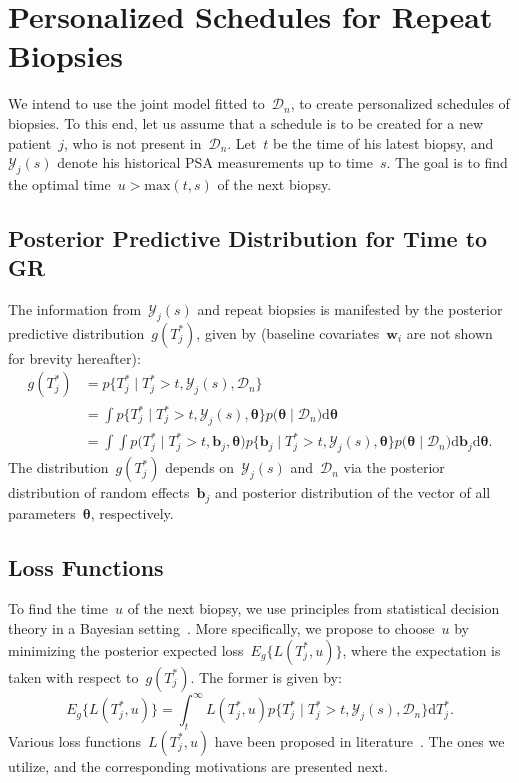 \section{Personalized Schedules for Repeat Biopsies}
\label{c2:sec:pers_sched_approaches}
We intend to use the joint model fitted to~$\mathcal{D}_n$, to create personalized schedules of biopsies. To this end, let us assume that a schedule is to be created for a new patient~$j$, who is not present in~$\mathcal{D}_n$. Let~$t$ be the time of his latest biopsy, and~$\mathcal{Y}_j(s)$ denote his historical PSA measurements up to time~$s$. The goal is to find the optimal time~$u > \mbox{max}(t,s)$ of the next biopsy.

\subsection{Posterior Predictive Distribution for Time to GR}
\label{c2:subsec:ppd_time_to_GR}
The information from~$\mathcal{Y}_j(s)$ and repeat biopsies is manifested by the posterior predictive distribution~$g(T^*_j)$, given by (baseline covariates~$\boldsymbol{w}_i$ are not shown for brevity hereafter):
\begin{equation*}
\label{c2:eq:dyn_dist_fail_time}
\begin{split}
g(T^*_j) &= p\big\{T^*_j \mid T^*_j > t, \mathcal{Y}_j(s), \mathcal{D}_n\big\}\\
&= \int p\big\{T^*_j \mid T^*_j > t, \mathcal{Y}_j(s), \boldsymbol{\theta}\big\}p\big(\boldsymbol{\theta} \mid \mathcal{D}_n\big) \mathrm{d} \boldsymbol{\theta}\\
&= \int \int p\big(T^*_j \mid T^*_j > t, \boldsymbol{b}_j, \boldsymbol{\theta}\big)p\big\{\boldsymbol{b}_j \mid T^*_j>t, \mathcal{Y}_j(s), \boldsymbol{\theta}\big\}p\big(\boldsymbol{\theta} \mid \mathcal{D}_n\big) \mathrm{d} \boldsymbol{b}_j \mathrm{d} \boldsymbol{\theta}.
\end{split}
\end{equation*}
The distribution~$g(T^*_j)$ depends on~$\mathcal{Y}_j(s)$ and~$\mathcal{D}_n$ via the posterior distribution of random effects~$\boldsymbol{b}_j$ and posterior distribution of the vector of all parameters~$\boldsymbol{\theta}$, respectively.


\subsection{Loss Functions}
\label{c2:subsec:loss_functions}
To find the time~$u$ of the next biopsy, we use principles from statistical decision theory in a Bayesian setting~\citep{bergerDecisionTheory,robertBayesianChoice}. More specifically, we propose to choose~$u$ by minimizing the posterior expected loss~$E_g\big\{L(T^*_j, u)\big\}$, where the expectation is taken with respect to~$g(T^*_j)$. The former is given by:
\begin{equation*}
E_g\big\{L(T^*_j, u)\big\} = \int_t^\infty L(T^*_j, u) p\big\{T^*_j \mid T^*_j > t, \mathcal{Y}_j(s), \mathcal{D}_n\big\} \mathrm{d} T^*_j.
\end{equation*}
Various loss functions~$L(T^*_j, u)$ have been proposed in literature~\citep{robertBayesianChoice}. The ones we utilize, and the corresponding motivations are presented next.

